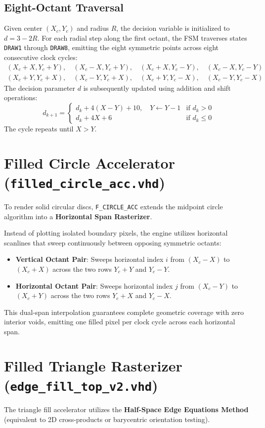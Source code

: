 \subsection{Eight-Octant Traversal}
Given center $(X_c, Y_c)$ and radius $R$, the decision variable is initialized to $d = 3 - 2R$. For each radial step along the first octant, the FSM traverses states \texttt{DRAW1} through \texttt{DRAW8}, emitting the eight symmetric points across eight consecutive clock cycles:
\begin{align}
(X_c + X, Y_c + Y), \quad (X_c - X, Y_c + Y), \quad (X_c + X, Y_c - Y), \quad (X_c - X, Y_c - Y) \\
(X_c + Y, Y_c + X), \quad (X_c - Y, Y_c + X), \quad (X_c + Y, Y_c - X), \quad (X_c - Y, Y_c - X)
\end{align}
The decision parameter $d$ is subsequently updated using addition and shift operations:
\begin{equation}
d_{k+1} = \begin{cases}
d_k + 4(X - Y) + 10, \quad Y \gets Y - 1 & \text{if } d_k > 0 \\
d_k + 4X + 6 & \text{if } d_k \le 0
\end{cases}
\end{equation}
The cycle repeats until $X > Y$.

\section{Filled Circle Accelerator (\texttt{filled\_circle\_acc.vhd})}
To render solid circular discs, \texttt{F\_CIRCLE\_ACC} extends the midpoint circle algorithm into a \textbf{Horizontal Span Rasterizer}.

Instead of plotting isolated boundary pixels, the engine utilizes horizontal scanlines that sweep continuously between opposing symmetric octants:
\begin{itemize}
    \item \textbf{Vertical Octant Pair}: Sweeps horizontal index $i$ from $(X_c - X)$ to $(X_c + X)$ across the two rows $Y_c + Y$ and $Y_c - Y$.
    \item \textbf{Horizontal Octant Pair}: Sweeps horizontal index $j$ from $(X_c - Y)$ to $(X_c + Y)$ across the two rows $Y_c + X$ and $Y_c - X$.
\end{itemize}
This dual-span interpolation guarantees complete geometric coverage with zero interior voids, emitting one filled pixel per clock cycle across each horizontal span.

\section{Filled Triangle Rasterizer (\texttt{edge\_fill\_top\_v2.vhd})}
The triangle fill accelerator utilizes the \textbf{Half-Space Edge Equations Method} (equivalent to 2D cross-products or barycentric orientation testing).

